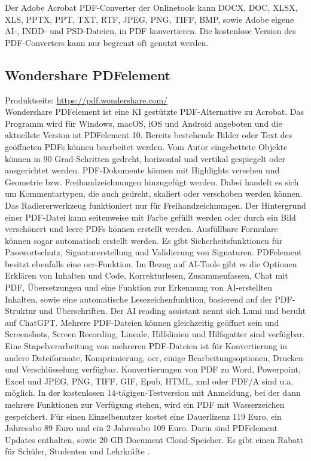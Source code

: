 \cite{adobe-search} Der Adobe Acrobat PDF-Converter der Onlinetools kann DOCX, DOC, XLSX, XLS, PPTX, PPT, TXT, RTF, JPEG, PNG, TIFF, BMP, sowie Adobe eigene AI-, INDD- und PSD-Dateien, in PDF konvertieren. \cite{adobe-formate} Die kostenlose Version des PDF-Converters kann nur begrenzt oft genutzt werden.

\subsection{Wondershare PDFelement}
Produktseite: \url{https://pdf.wondershare.com/} \\
Wondershare PDFelement ist eine KI gestützte PDF-Alternative zu Acrobat. Das Programm wird für Windows, macOS, iOS und Android angeboten und die aktuellste Version ist PDFelement 10. Bereits bestehende Bilder oder Text des geöffneten PDFs können bearbeitet werden. Vom Autor eingebettete Objekte können in 90 Grad-Schritten gedreht, horizontal und vertikal gespiegelt oder ausgerichtet werden. PDF-Dokumente können mit Highlights versehen und Geometrie bzw. Freihandzeichnungen hinzugefügt werden. Dabei handelt es sich um Kommentartypen, die auch gedreht, skaliert oder verschoben werden können. Das Radiererwerkzeug funktioniert nur für Freihandzeichnungen. Der Hintergrund einer PDF-Datei kann seitenweise mit Farbe gefüllt werden oder durch ein Bild verschönert und leere PDFs können erstellt werden. Ausfüllbare Formulare können sogar automatisch erstellt werden. Es gibt Sicherheitsfunktionen für Passwortschutz, Signaturerstellung und Validierung von Signaturen. PDFelement besitzt ebenfalls eine \gls{ocr}-Funktion. Im Bezug auf AI-Tools gibt es die Optionen Erklären von Inhalten und Code, Korrekturlesen, Zusammenfassen, Chat mit PDF, Übersetzungen und eine Funktion zur Erkennung von AI-erstellten Inhalten, sowie eine automatische Lesezeichenfunktion, basierend auf der PDF-Struktur und Überschriften. Der AI reading assistant nennt sich Lumi und beruht auf ChatGPT. Mehrere PDF-Dateien können gleichzeitig geöffnet sein und Screenshots, Screen Recording, Lineale, Hilfslinien und Hilfsgatter sind verfügbar. Eine Stapelverarbeitung von mehreren PDF-Dateien ist für Konvertierung in andere Dateiformate, Komprimierung, \gls{ocr}, einige Bearbeitungsoptionen, Drucken und Verschlüsselung verfügbar. Konvertierungen von PDF zu Word, Powerpoint, Excel und JPEG, PNG, TIFF, GIF, Epub, HTML, \gls{xml} oder PDF/A sind u.a. möglich. In der kostenlosen 14-tägigen-Testversion mit Anmeldung, bei der dann mehrere Funktionen zur Verfügung stehen, wird ein PDF mit Wasserzeichen gespeichert. Für einen Einzelbenutzer kostet eine Dauerlizenz 119 Euro, ein Jahresabo 89 Euro und ein 2-Jahresabo 109 Euro. Darin sind PDFelement Updates enthalten, sowie 20 GB Document Cloud-Speicher. Es gibt einen Rabatt für Schüler, Studenten und Lehrkräfte \cite{wondershare-um}. 

